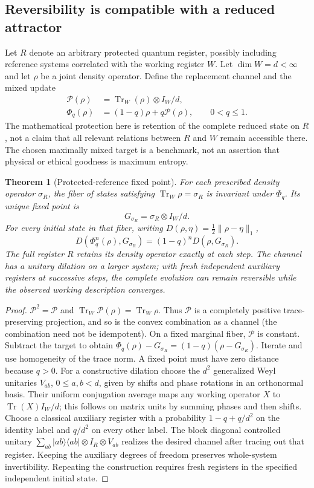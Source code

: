 \documentclass[11pt,a4paper]{article}
\newtheorem{theorem}{Theorem}[section]\newtheorem{proposition}[theorem]{Proposition}\newtheorem{definition}[theorem]{Definition}\newtheorem{example}[theorem]{Example}
\begin{document}
\subsection{Reversibility is compatible with a reduced attractor}
Let $R$ denote an arbitrary protected quantum register, possibly including reference systems correlated with the working register $W$. Let $\dim W=d<\infty$ and let $\rho$ be a joint density operator. Define the replacement channel and the mixed update
\begin{align}
  \mathcal P(\rho)&=\operatorname{Tr}_W(\rho)\otimes I_W/d,\\
  \Phi_q(\rho)&=(1-q)\rho+q\mathcal P(\rho),\qquad 0<q\leq1.
\end{align}
The mathematical protection here is retention of the complete reduced state on $R$, not a claim that all relevant relations between $R$ and $W$ remain accessible there. The chosen maximally mixed target is a benchmark, not an assertion that physical or ethical goodness is maximum entropy.
\begin{theorem}[Protected-reference fixed point]\label{thm:protectedfixed}
For each prescribed density operator $\sigma_R$, the fiber of states satisfying $\operatorname{Tr}_W\rho=\sigma_R$ is invariant under $\Phi_q$. Its unique fixed point is
\[G_{\sigma_R}=\sigma_R\otimes I_W/d.\]
For every initial state in that fiber, writing $D(\rho,\eta)=\tfrac12\|\rho-\eta\|_1$,
\[D(\Phi_q^n(\rho),G_{\sigma_R})=(1-q)^n D(\rho,G_{\sigma_R}).\]
The full register $R$ retains its density operator exactly at each step. The channel has a unitary dilation on a larger system; with fresh independent auxiliary registers at successive steps, the complete evolution can remain reversible while the observed working description converges.
\end{theorem}
\begin{proof} $\mathcal P^2=\mathcal P$ and $\operatorname{Tr}_W\mathcal P(\rho)=\operatorname{Tr}_W\rho$. Thus $\mathcal P$ is a completely positive trace-preserving projection, and so is the convex combination as a channel (the combination need not be idempotent). On a fixed marginal fiber, $\mathcal P$ is constant. Subtract the target to obtain $\Phi_q(\rho)-G_{\sigma_R}=(1-q)(\rho-G_{\sigma_R})$. Iterate and use homogeneity of the trace norm. A fixed point must have zero distance because $q>0$. For a constructive dilation choose the $d^2$ generalized Weyl unitaries $V_{ab}$, $0\le a,b<d$, given by shifts and phase rotations in an orthonormal basis. Their uniform conjugation average maps any working operator $X$ to $\operatorname{Tr}(X)I_W/d$; this follows on matrix units by summing phases and then shifts. Choose a classical auxiliary register with a probability $1-q+q/d^2$ on the identity label and $q/d^2$ on every other label. The block diagonal controlled unitary $\sum_{ab}|ab\rangle\langle ab|\otimes I_R\otimes V_{ab}$ realizes the desired channel after tracing out that register. Keeping the auxiliary degrees of freedom preserves whole-system invertibility. Repeating the construction requires fresh registers in the specified independent initial state.\end{proof}
\end{document}

